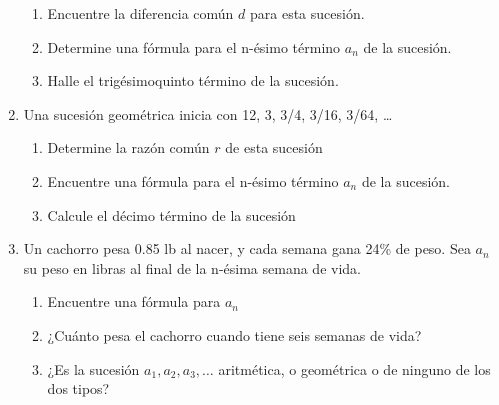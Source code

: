 \documentclass[letterpaper,fleqn]{article}
\begin{document}
\begin{enumerate}
\begin{enumerate}
\item Encuentre la diferencia común $d$ para esta sucesión.\noanswer
\item Determine una fórmula para el n-ésimo término $a_{n}$ de la sucesión.\noanswer
\item Halle el trigésimoquinto término de la sucesión.\noanswer
\end{enumerate}
\item Una sucesión geométrica inicia con 12, 3, 3/4, 3/16, 3/64, \ldots
\begin{enumerate}
\item Determine la razón común $r$ de esta sucesión \noanswer
\item Encuentre una fórmula para el n-ésimo término $a_{n}$ de la sucesión.\noanswer
\item Calcule el décimo término de la sucesión\noanswer
\end{enumerate}
 \item Un cachorro pesa 0.85 lb al nacer, y cada semana gana 24\% de peso. Sea $a_{n}$ su peso en libras al final de la n-ésima semana de vida.
\begin{enumerate}
\item Encuentre una fórmula para $a_{n}$\noanswer
\item ¿Cuánto pesa el cachorro cuando tiene seis semanas de vida?\noanswer
\item ¿Es la sucesión $a_{1},a_{2},a_{3},\ldots$ aritmética, o geométrica o de ninguno de los dos tipos?\noanswer
\end{enumerate}
 \end{enumerate}
\end{document}

